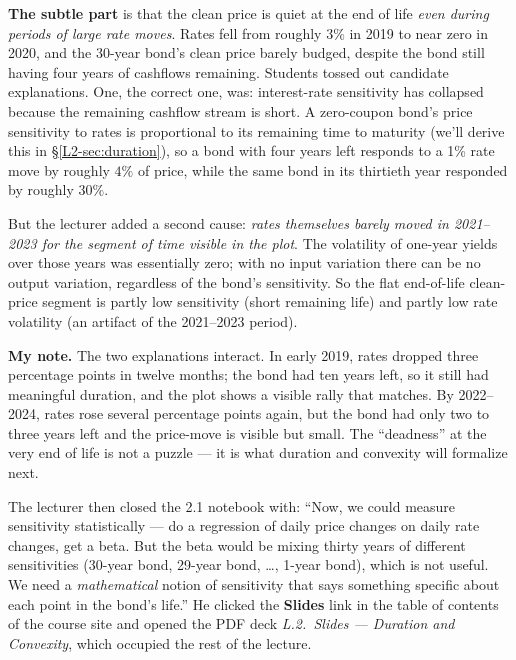 \textbf{The subtle part} is that the clean price is quiet at the end of life
\emph{even during periods of large rate moves}. Rates fell from roughly $3\%$
in 2019 to near zero in 2020, and the 30-year bond's clean price barely
budged, despite the bond still having four years of cashflows remaining.
Students tossed out candidate explanations. One, the correct one, was:
interest-rate sensitivity has collapsed because the remaining cashflow stream
is short. A zero-coupon bond's price sensitivity to rates is proportional to
its remaining time to maturity (we'll derive this in \S\ref{L2-sec:duration}),
so a bond with four years left responds to a 1\% rate move by roughly $4\%$
of price, while the same bond in its thirtieth year responded by roughly
$30\%$.

But the lecturer added a second cause: \emph{rates themselves barely moved
in 2021--2023 for the segment of time visible in the plot}. The volatility of
one-year yields over those years was essentially zero; with no input
variation there can be no output variation, regardless of the bond's
sensitivity. So the flat end-of-life clean-price segment is partly low
sensitivity (short remaining life) and partly low rate volatility (an
artifact of the 2021--2023 period).

\begin{checkpoint}
\textbf{My note.} The two explanations interact. In early 2019, rates
dropped three percentage points in twelve months; the bond had ten years
left, so it still had meaningful duration, and the plot shows a visible
rally that matches. By 2022--2024, rates rose several percentage points
again, but the bond had only two to three years left and the price-move
is visible but small. The ``deadness'' at the very end of life is not a
puzzle --- it is what duration and convexity will formalize next.
\end{checkpoint}

The lecturer then closed the 2.1 notebook with: ``Now, we could measure
sensitivity statistically --- do a regression of daily price changes on daily
rate changes, get a beta. But the beta would be mixing thirty years of
different sensitivities (30-year bond, 29-year bond, \ldots, 1-year bond),
which is not useful. We need a \emph{mathematical} notion of sensitivity that
says something specific about each point in the bond's life.'' He clicked
the \textbf{Slides} link in the table of contents of the course site and
opened the PDF deck \emph{L.2.~Slides --- Duration and Convexity}, which
occupied the rest of the lecture.

